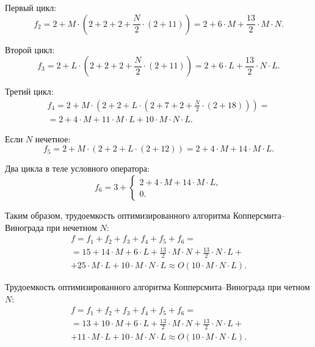 Первый цикл:
\begin{equation}
f_2 = 2 + M \cdot (2 + 2 + 2 + \frac{N}{2} \cdot (2 + 11)) = 2 + 6 \cdot M + \frac{13}{2} \cdot M \cdot N.
\end{equation}

Второй цикл:
\begin{equation}
f_3 = 2 + L \cdot (2 + 2 + 2 + \frac{N}{2} \cdot (2 + 11)) = 2 + 6 \cdot L + \frac{13}{2} \cdot N \cdot L.
\end{equation}

Третий цикл:
\begin{equation}
\begin{gathered}
f_4 = 2 + M \cdot (2 + 2 + L \cdot (2 + 7 + 2 + \frac{N}{2} \cdot (2 + 18))) = \\ = 2 + 4 \cdot M + 11 \cdot M \cdot L + 10 \cdot M \cdot N \cdot L.
\end{gathered}
\end{equation}

Если $N$ нечетное:
\begin{equation}
f_5 = 2 + M \cdot (2 + 2 + L \cdot (2 + 12)) = 2 + 4 \cdot M + 14 \cdot M \cdot L.
\end{equation}

Два цикла в теле условного оператора:
\begin{equation}
f_6 = 3 +
	\begin{cases}
    2 + 4 \cdot M + 14 \cdot M \cdot L, \\
    0.
    \end{cases}
\end{equation}

Таким образом, трудоемкость оптимизированного алгоритма Копперсмита--Винограда при нечетном $N$:
\begin{equation}
\begin{gathered}
f = f_1 + f_2 + f_3 + f_4 + f_5 + f_6 = \\ = 15 + 14 \cdot M + 6 \cdot L + \frac{13}{2} \cdot M \cdot N + \frac{13}{2} \cdot N \cdot L + \\ + 25 \cdot M \cdot L + 10 \cdot M \cdot N \cdot L \approx O(10 \cdot M \cdot N \cdot L).
\end{gathered}
\end{equation}

Трудоемкость оптимизированного алгоритма Копперсмита--Винограда при четном $N$:
\begin{equation}
\begin{gathered}
f = f_1 + f_2 + f_3 + f_4 + f_5 + f_6 = \\ = 13 + 10 \cdot M + 6 \cdot L + \frac{13}{2} \cdot M \cdot N + \frac{13}{2} \cdot N \cdot L + \\ + 11 \cdot M \cdot L + 10 \cdot M \cdot N \cdot L \approx O(10 \cdot M \cdot N \cdot L).
\end{gathered}
\end{equation}


